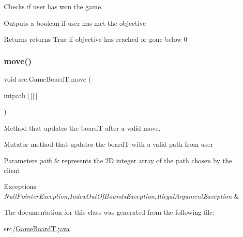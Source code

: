 Checks if user has won the game. 

Outputs a boolean if user has met the objective \begin{DoxyReturn}{Returns}
returns True if objective has reached or gone below 0 
\end{DoxyReturn}
\mbox{\label{classsrc_1_1GameBoardT_a77afa90110ea1b3ba85054f0944b74fb}} 
\subsubsection{\texorpdfstring{move()}{move()}}
{\footnotesize\ttfamily void src.\+Game\+Board\+T.\+move (\begin{DoxyParamCaption}\item[{intpath}]{\mbox{[}$\,$\mbox{]}\mbox{[}$\,$\mbox{]} }\end{DoxyParamCaption})}



Method that updates the boardT after a valid move. 

Mutator method that updates the boardT with a valid path from user 
\begin{DoxyParams}{Parameters}
{\em path} & represents the 2D integer array of the path chosen by the client \\
\hline
\end{DoxyParams}

\begin{DoxyExceptions}{Exceptions}
{\em Null\+Pointer\+Exception,Index\+Out\+Of\+Bounds\+Exception,Illegal\+Argument\+Exception} & \\
\hline
\end{DoxyExceptions}


The documentation for this class was generated from the following file\+:\begin{DoxyCompactItemize}
\item 
src/\hyperlink{GameBoardT_8java}{Game\+Board\+T.\+java}\end{DoxyCompactItemize}
